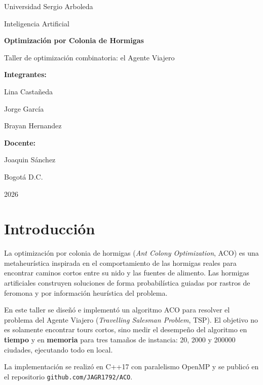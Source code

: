 \documentclass[12pt,a4paper]{article}
\begin{document}
\begin{center}
{\large Universidad Sergio Arboleda}

\vspace{1cm}
{\large Inteligencia Artificial}

\vspace{3cm}
{\LARGE\bfseries Optimización por Colonia de Hormigas}

\vspace{0.4cm}
{\Large Taller de optimización combinatoria: el Agente Viajero}

\vspace{4cm}
{\bfseries Integrantes:}

Lina Castañeda

Jorge García

Brayan Hernandez

\vspace{2cm}
{\bfseries Docente:}

Joaquin Sánchez

\vspace{4cm}
Bogotá D.C.

2026
\end{center}
\newpage

\tableofcontents
\newpage

\section{Introducción}

La optimización por colonia de hormigas (\textit{Ant Colony Optimization}, ACO)
es una metaheurística inspirada en el comportamiento de las hormigas reales para
encontrar caminos cortos entre su nido y las fuentes de alimento. Las hormigas
artificiales construyen soluciones de forma probabilística guiadas por rastros de
feromona y por información heurística del problema.

En este taller se diseñó e implementó un algoritmo ACO para resolver el problema
del Agente Viajero (\textit{Travelling Salesman Problem}, TSP). El objetivo no es
solamente encontrar tours cortos, sino medir el desempeño del algoritmo en
\textbf{tiempo} y en \textbf{memoria} para tres tamaños de instancia:
20, 2000 y 200000 ciudades, ejecutando todo en local.

La implementación se realizó en C++17 con paralelismo OpenMP y se publicó en el
repositorio \texttt{github.com/JAGR1792/ACO}.
\end{document}
